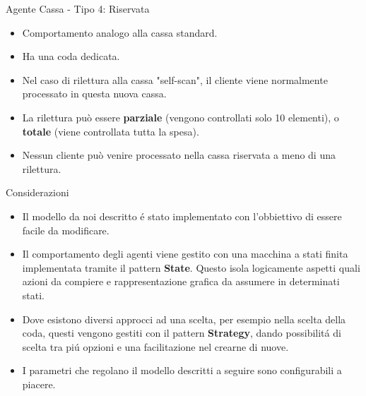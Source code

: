 \begin{frame}{Agente Cassa - Tipo 4: Riservata}
	
	\begin{itemize}
		\item Comportamento analogo alla cassa standard.
		\item Ha una coda dedicata.
		\item Nel caso di rilettura alla cassa "self-scan", il cliente viene normalmente processato in questa nuova cassa.
		\item La rilettura può essere \textbf{parziale} (vengono controllati solo 10 elementi), o \textbf{totale} (viene controllata tutta la spesa).
		\item Nessun cliente può venire processato nella cassa riservata a meno di una rilettura.
	\end{itemize}
\end{frame}




\begin{frame}{Considerazioni}
  \begin{itemize}
  \item Il modello da noi descritto é stato implementato con
    l'obbiettivo di essere facile da modificare.
    
  \item Il comportamento degli agenti viene gestito con una
    macchina a stati finita implementata tramite il pattern
    \textbf{State}.  Questo isola logicamente aspetti quali
    azioni da compiere e rappresentazione grafica da assumere in
    determinati stati.

  \item Dove esistono diversi approcci ad una scelta, per
    esempio nella scelta della coda, questi vengono gestiti con
    il pattern \textbf{Strategy}, dando possibilitá di scelta
    tra piú opzioni e una facilitazione nel crearne di nuove.

  \item I parametri che regolano il modello descritti a seguire
    sono configurabili a piacere.
  \end{itemize}
\end{frame}




